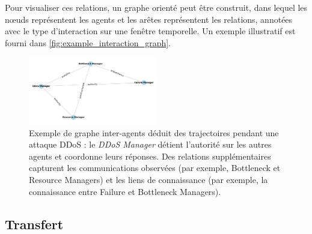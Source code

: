 Pour visualiser ces relations, un graphe orienté peut être construit, dans lequel les nœuds représentent les agents et les arêtes représentent les relations, annotées avec le type d'interaction sur une fenêtre temporelle. Un exemple illustratif est fourni dans \autoref{fig:example_interaction_graph}.

\begin{figure}[h!]
    \centering
    \includegraphics[trim=0cm 2cm 0cm 2cm, clip, width=0.5\textwidth]{figures/roles_graph.pdf}
    \caption{Exemple de graphe inter-agents déduit des trajectoires pendant une attaque DDoS : le \textit{DDoS Manager} détient l'autorité sur les autres agents et coordonne leurs réponses. Des relations supplémentaires capturent les communications observées (par exemple, Bottleneck et Resource Managers) et les liens de connaissance (par exemple, la connaissance entre Failure et Bottleneck Managers).}
    \label{fig:example_interaction_graph}
\end{figure}





\subsection{Transfert}
\label{sec:transfert}


